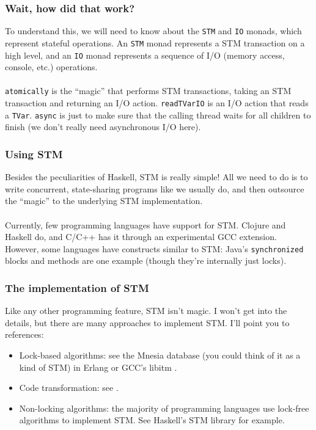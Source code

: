 \documentclass{beamer}
\theoremstyle{plain}
\begin{document}
\begin{frame}[fragile]
  \frametitle{Wait, how did that work?}
  To understand this, we will need to know about the \lstinline{STM} and \lstinline{IO} monads, which
  represent stateful operations. An \lstinline{STM} monad represents a STM transaction on a high level,
  and an \lstinline{IO} monad represents a sequence of I/O (memory access, console, etc.) operations.\\~\\

  \lstinline{atomically} is the ``magic'' that performs STM transactions, taking an STM transaction and
  returning an I/O action. \lstinline{readTVarIO} is an I/O action that reads a
  \lstinline{TVar}. \lstinline{async} is just to make sure that the calling thread waits for all children to
  finish (we don't really need asynchronous I/O here).
\end{frame}

\begin{frame}
  \frametitle{Using STM}
  Besides the peculiarities of Haskell, STM is really simple! All we need to do is to write concurrent,
  state-sharing programs like we usually do, and then outsource the ``magic'' to the underlying STM
  implementation.\\~\\

  Currently, few programming languages have support for STM. Clojure and Haskell do, and C/C++ has it through
  an experimental GCC extension. However, some languages have constructs similar to STM: Java's \lstinline{synchronized}
  blocks and methods are one example (though they're internally just locks).
\end{frame}

\begin{frame}
  \frametitle{The implementation of STM}
  Like any other programming feature, STM isn't magic. I won't get into the details, but there are many approaches to implement
  STM. I'll point you to references:
  \begin{itemize}
  \item Lock-based algorithms: see the Mnesia database (you could think of it as a kind of
    STM) in Erlang \cite{mnesia} or GCC's libitm \cite{libitm}.
  \item Code transformation: see \cite{deuce}.
  \item Non-locking algorithms: the majority of programming languages use lock-free algorithms to implement
    STM. See Haskell's STM library \cite{haskellstm} for example.
  \end{itemize}
\end{frame}
\end{document}
